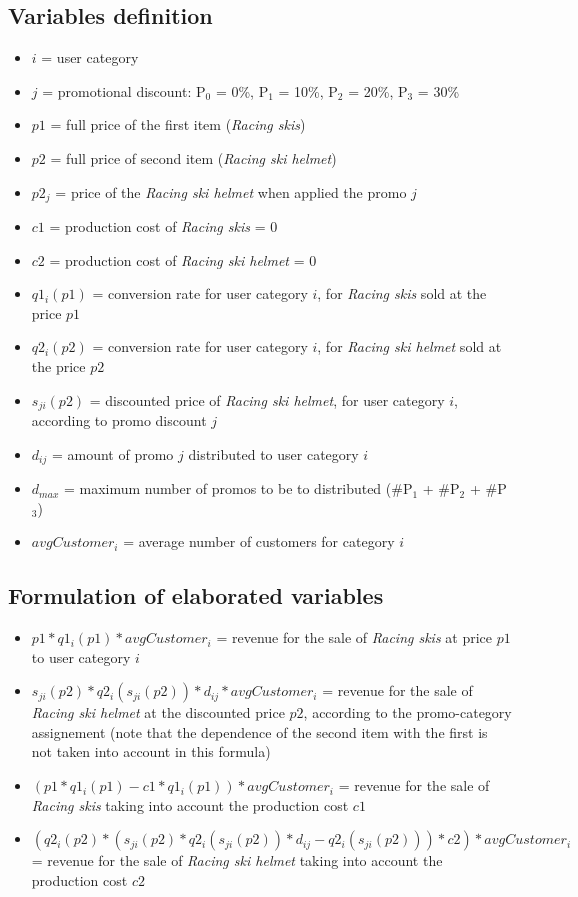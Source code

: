 \subsection*{Variables definition}
\begin{itemize}
\item $i$ = user category 
\item $j$ = promotional discount: P$_0$ = 0\%, P$_1$ = 10\%, P$_2$ = 20\%, P$_3$ = 30\%
\item $p1$ = full price of the first item (\textit{Racing skis}) 
\item $p2$ = full price of second item (\textit{Racing ski helmet})
\item $p2_j$ = price of the \textit{Racing ski helmet} when applied the promo $j$
\item $c1$ = production cost of \textit{Racing skis} = 0
\item $c2$ = production cost of \textit{Racing ski helmet} = 0
\item $q1_i(p1)$ = conversion rate for user category $i$, for \textit{Racing skis} sold at the price $p1$
\item $q2_i(p2)$ = conversion rate for user category $i$, for \textit{Racing ski helmet} sold at the price $p2$
\item $s_{ji}(p2)$ = discounted price of \textit{Racing ski helmet}, for user category $i$, according to promo discount $j$
\item $d_{ij}$ = amount of promo $j$ distributed to user category $i$
\item $d_{max}$ = maximum number of promos to be to distributed (\#P$_1$ + \#P$_2$ + \#P$_3$)
\item $avgCustomer_i$ = average number of customers for category $i$
\end{itemize}


\subsection*{Formulation of elaborated variables}
\begin{itemize}
\item $p1*q1_i(p1)*avgCustomer_i$ = revenue for the sale of \textit{Racing skis} at price $p1$ to user category $i$ 
\item $s_{ji}(p2)*q2_i(s_{ji}(p2))*d_{ij}*avgCustomer_i$  = revenue for the sale of \textit{Racing ski helmet} at the discounted price $p2$, according to the promo-category assignement (note that the dependence of the second item with the first is not taken into account in this formula)
\item $(p1*q1_i(p1)-c1*q1_i(p1))*avgCustomer_i$ = revenue for the sale of \textit{Racing skis} taking into account the production cost $c1$
\item $(q2_i(p2)*(s_{ji}(p2)*q2_i(s_{ji}(p2))*d_{ij}-q2_i(s_{ji}(p2)))*c2)*avgCustomer_i$ = revenue for the sale of \textit{Racing ski helmet} taking into account the production cost $c2$
\end{itemize}


